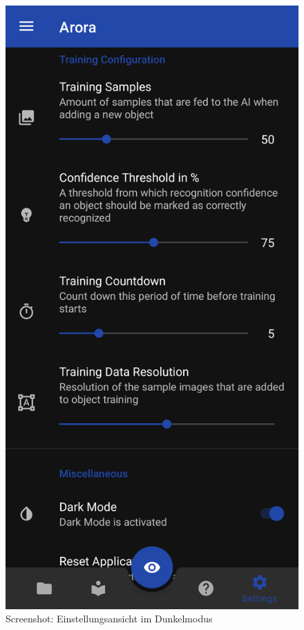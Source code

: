 \documentclass[oneside]{ausarbeitung}
\begin{document}
\begin{figure}[hptb]
	\centering
	\includegraphics[height=0.6\textheight]{images/screenshots/settings-dark.png}
	\caption{Screenshot: Einstellungsansicht im Dunkelmodus}
	\label{fig:screenshot:settings-dark}
\end{figure}
\end{document}
